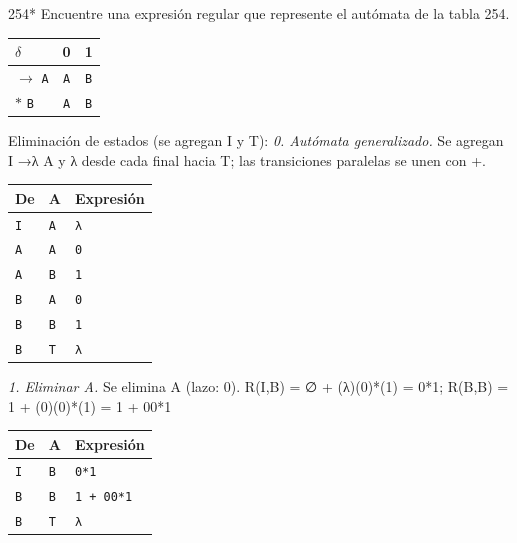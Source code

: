 \documentclass[11pt]{article}
\begin{document}


\begin{ejercicio}{254}{*}
Encuentre una expresión regular que represente el autómata de la tabla 254.
\end{ejercicio}
\proc \begin{center}\small\begin{tabular}{lcc}\toprule
$\delta$ & 0 & 1 \\\midrule
$\to$ \texttt{A} & \texttt{A} & \texttt{B} \\
$*$ \texttt{B} & \texttt{A} & \texttt{B} \\
\bottomrule\end{tabular}\end{center}
Eliminación de estados (se agregan I y T):
\textit{0. Autómata generalizado.} Se agregan I →λ A y λ desde cada final hacia T; las transiciones paralelas se unen con +.
\begin{center}\footnotesize\begin{tabular}{lll}\toprule
De & A & Expresión \\\midrule
\texttt{I} & \texttt{A} & \texttt{λ} \\
\texttt{A} & \texttt{A} & \texttt{0} \\
\texttt{A} & \texttt{B} & \texttt{1} \\
\texttt{B} & \texttt{A} & \texttt{0} \\
\texttt{B} & \texttt{B} & \texttt{1} \\
\texttt{B} & \texttt{T} & \texttt{λ} \\
\bottomrule\end{tabular}\end{center}
\textit{1. Eliminar A.} Se elimina A (lazo: 0). R(I,B) = ∅ + (λ)(0)*(1) = 0*1; R(B,B) = 1 + (0)(0)*(1) = 1 + 00*1
\begin{center}\footnotesize\begin{tabular}{lll}\toprule
De & A & Expresión \\\midrule
\texttt{I} & \texttt{B} & \texttt{0*1} \\
\texttt{B} & \texttt{B} & \texttt{1 + 00*1} \\
\texttt{B} & \texttt{T} & \texttt{λ} \\
\bottomrule\end{tabular}\end{center}
\end{document}

